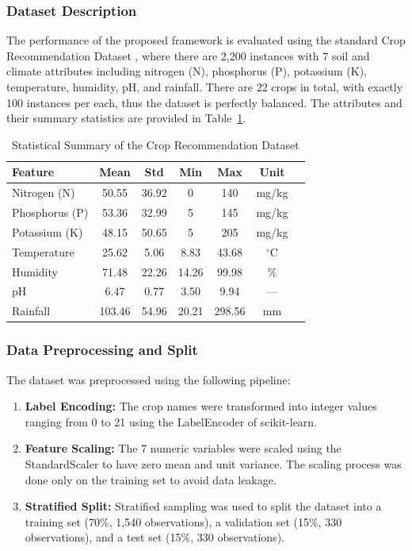 \documentclass[journal]{IEEEtran}
\begin{document}
\subsubsection{Dataset Description}

The performance of the proposed framework is evaluated using the standard Crop Recommendation Dataset \cite{cropdataset}, where there are 2,200 instances with 7 soil and climate attributes including nitrogen (N), phosphorus (P), potassium (K), temperature, humidity, pH, and rainfall. There are 22 crops in total, with exactly 100 instances per each, thus the dataset is perfectly balanced. The attributes and their summary statistics are provided in Table~\ref{tab:dataset_stats}.

\begin{table}[t]
\centering
\caption{Statistical Summary of the Crop Recommendation Dataset}
\label{tab:dataset_stats}
\begin{tabular}{lcccccc}
\hline
\textbf{Feature} & \textbf{Mean} & \textbf{Std} & \textbf{Min} & \textbf{Max} & \textbf{Unit} \\
\hline
Nitrogen (N) & 50.55 & 36.92 & 0 & 140 & mg/kg \\
Phosphorus (P) & 53.36 & 32.99 & 5 & 145 & mg/kg \\
Potassium (K) & 48.15 & 50.65 & 5 & 205 & mg/kg \\
Temperature & 25.62 & 5.06 & 8.83 & 43.68 & $^\circ$C \\
Humidity & 71.48 & 22.26 & 14.26 & 99.98 & \% \\
pH & 6.47 & 0.77 & 3.50 & 9.94 & --- \\
Rainfall & 103.46 & 54.96 & 20.21 & 298.56 & mm \\
\hline
\end{tabular}
\end{table}

\subsubsection{Data Preprocessing and Split}

The dataset was preprocessed using the following pipeline:

\begin{enumerate}
    \item \textbf{Label Encoding:} The crop names were transformed into integer values ranging from 0 to 21 using the LabelEncoder of scikit-learn.
    \item \textbf{Feature Scaling:} The 7 numeric variables were scaled using the StandardScaler to have zero mean and unit variance. The scaling process was done only on the training set to avoid data leakage.
    \item \textbf{Stratified Split:} Stratified sampling was used to split the dataset into a training set (70\%, 1,540 observations), a validation set (15\%, 330 observations), and a test set (15\%, 330 observations).
\end{enumerate}
\end{document}
